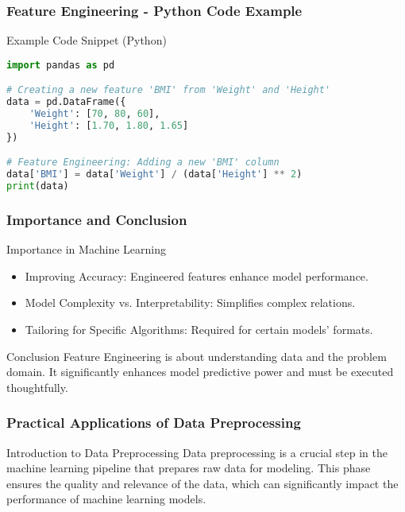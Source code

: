 \documentclass{beamer}
\begin{document}
\begin{frame}[fragile]
    \frametitle{Feature Engineering - Python Code Example}
    \begin{block}{Example Code Snippet (Python)}
        \begin{lstlisting}[language=Python]
import pandas as pd

# Creating a new feature 'BMI' from 'Weight' and 'Height'
data = pd.DataFrame({
    'Weight': [70, 80, 60],
    'Height': [1.70, 1.80, 1.65]
})

# Feature Engineering: Adding a new 'BMI' column
data['BMI'] = data['Weight'] / (data['Height'] ** 2)
print(data)
        \end{lstlisting}
    \end{block}
\end{frame}

\begin{frame}[fragile]
    \frametitle{Importance and Conclusion}
    \begin{block}{Importance in Machine Learning}
        \begin{itemize}
            \item Improving Accuracy: Engineered features enhance model performance.
            \item Model Complexity vs. Interpretability: Simplifies complex relations.
            \item Tailoring for Specific Algorithms: Required for certain models' formats.
        \end{itemize}
    \end{block}
    
    \begin{block}{Conclusion}
        Feature Engineering is about understanding data and the problem domain. It significantly enhances model predictive power and must be executed thoughtfully.
    \end{block}
\end{frame}

\begin{frame}[fragile]
    \frametitle{Practical Applications of Data Preprocessing}
    \begin{block}{Introduction to Data Preprocessing}
        Data preprocessing is a crucial step in the machine learning pipeline that prepares raw data for modeling. This phase ensures the quality and relevance of the data, which can significantly impact the performance of machine learning models.
    \end{block}
\end{frame}
\end{document}
